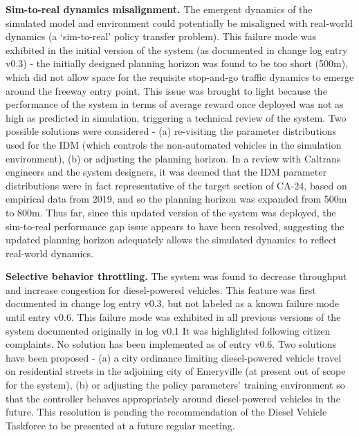 \documentclass[12pt, a4paper, twocolumn]{article}
\begin{document}
\begin{multicols}{2}
{}{%

\textbf{Sim-to-real dynamics misalignment.}
The emergent dynamics of the simulated model and environment could potentially be misaligned with real-world dynamics (a `sim-to-real' policy transfer problem).
This failure mode was exhibited in the initial version of the system (as documented in change log entry v0.3) - the initially designed planning horizon was found to be too short (500m), which did not allow space for the requisite stop-and-go traffic dynamics to emerge around the freeway entry point.
This issue was brought to light because the performance of the system in terms of average reward once deployed was not as high as predicted in simulation, triggering a technical review of the system.
Two possible solutions were considered - (a) re-visiting the parameter distributions used for the IDM (which controls the non-automated vehicles in the simulation environment), (b) or adjusting the planning horizon.
In a review with Caltrans engineers and the system designers, it was deemed that the IDM parameter distributions were in fact representative of the target section of CA-24, based on empirical data from 2019, and so the planning horizon was expanded from 500m to 800m.
Thus far, since this updated version of the system was deployed, the sim-to-real performance gap issue appears to have been resolved, suggesting the updated planning horizon adequately allows the simulated dynamics to reflect real-world dynamics.

\textbf{Selective behavior throttling.}
The system was found to decrease throughput and increase congestion for diesel-powered vehicles. 
This feature was first documented in change log entry v0.3, but not labeled as a known failure mode until entry v0.6.
This failure mode was exhibited in all previous versions of the system documented originally in log v0.1
It was highlighted following citizen complaints.
No solution has been implemented as of entry v0.6.
Two solutions have been proposed - (a) a city ordinance limiting diesel-powered vehicle travel on residential streets in the adjoining city of Emeryville (at present out of scope for the system), (b) or adjusting the policy parameters' training environment so that the controller behaves appropriately around diesel-powered vehicles in the future.
This resolution is pending the recommendation of the Diesel Vehicle Taskforce to be presented at a future regular meeting.

}


\end{multicols}
\end{document}
